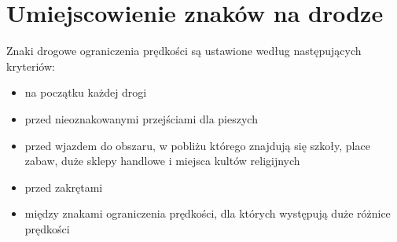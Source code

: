 \section{Umiejscowienie znaków na drodze}
\label{sec:speedLimitLocalization}
Znaki drogowe ograniczenia prędkości są ustawione według następujących kryteriów:
\begin{itemize}
\item na początku każdej drogi
\item przed nieoznakowanymi przejściami dla pieszych
\item przed wjazdem do obszaru, w pobliżu którego znajdują się szkoły, place zabaw, duże sklepy handlowe i miejsca kultów religijnych
\item przed zakrętami
\item między znakami ograniczenia prędkości, dla których występują duże różnice prędkości
\end{itemize}


